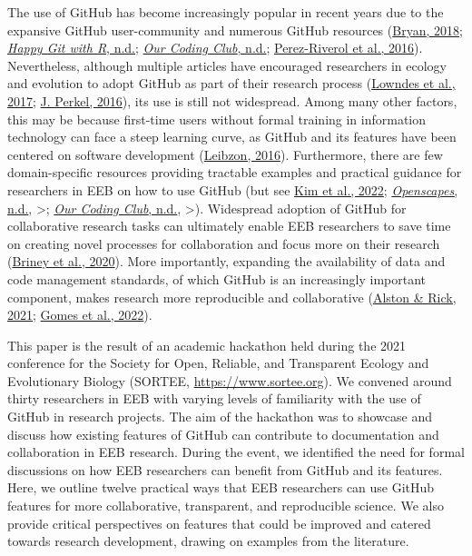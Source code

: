 The use of GitHub has become increasingly popular in recent years due to the expansive GitHub user-community and numerous GitHub resources (\protect\hyperlink{ref-RVetqmsg}{Bryan, 2018}; \protect\hyperlink{ref-13jOlVcpp}{\emph{Happy Git with R}, n.d.}; \protect\hyperlink{ref-u5aEVE4B}{\emph{Our Coding Club}, n.d.}; \protect\hyperlink{ref-kEX5dgzK}{Perez-Riverol et al., 2016}).
Nevertheless, although multiple articles have encouraged researchers in ecology and evolution to adopt GitHub as part of their research process (\protect\hyperlink{ref-3DKwn1sY}{Lowndes et al., 2017}; \protect\hyperlink{ref-10ghgV3S8}{J. Perkel, 2016}), its use is still not widespread.
Among many other factors, this may be because first-time users without formal training in information technology can face a steep learning curve, as GitHub and its features have been centered on software development (\protect\hyperlink{ref-139b0pSGc}{Leibzon, 2016}).
Furthermore, there are few domain-specific resources providing tractable examples and practical guidance for researchers in EEB on how to use GitHub (but see \protect\hyperlink{ref-lJAgyhYq}{Kim et al., 2022}; \protect\hyperlink{ref-nDkLlAch}{\emph{Openscapes}, n.d.}, \textgreater; \protect\hyperlink{ref-u5aEVE4B}{\emph{Our Coding Club}, n.d.}, \textgreater).
Widespread adoption of GitHub for collaborative research tasks can ultimately enable EEB researchers to save time on creating novel processes for collaboration and focus more on their research (\protect\hyperlink{ref-ydrk01SR}{Briney et al., 2020}).
More importantly, expanding the availability of data and code management standards, of which GitHub is an increasingly important component, makes research more reproducible and collaborative (\protect\hyperlink{ref-13QX8XU3J}{Alston \& Rick, 2021}; \protect\hyperlink{ref-VDJput1V}{Gomes et al., 2022}).

This paper is the result of an academic hackathon held during the 2021 conference for the Society for Open, Reliable, and Transparent Ecology and Evolutionary Biology (SORTEE, \url{https://www.sortee.org}).
We convened around thirty researchers in EEB with varying levels of familiarity with the use of GitHub in research projects.
The aim of the hackathon was to showcase and discuss how existing features of GitHub can contribute to documentation and collaboration in EEB research.
During the event, we identified the need for formal discussions on how EEB researchers can benefit from GitHub and its features.
Here, we outline twelve practical ways that EEB researchers can use GitHub features for more collaborative, transparent, and reproducible science.
We also provide critical perspectives on features that could be improved and catered towards research development, drawing on examples from the literature.

